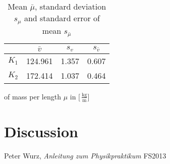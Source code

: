\documentclass[abstract=on]{scrreprt}
\newcommand{\unit}[1]{\ensuremath{\, \mathrm{#1}}}
\begin{document}
\begin{table}[H]
\center
\begin{tabular}{|c|ccc|}
\cline{2-4}
\multicolumn{1}{c|}{}& $\bar{v}$ & $s_{v}$ & $s_{\bar{v}}$\\ \hline
$K_1$ & 124.961 & 1.357 & 0.607 \\ \hline
$K_2$ & 172.414 & 1.037 & 0.464\\ \hline
\end{tabular}
\caption{Mean $\bar{\mu}$, standard deviation $s_{\mu}$ and standard error of mean $s_{\bar{\mu}}$} of mass per length $\mu$ in [$\unit{\frac{kg}{m}}$]
\end{table}

\section{Discussion}

\begin{thebibliography}{9}

  Peter Wurz,
  \emph{Anleitung zum Physikpraktikum}
  FS2013

\end{thebibliography}
\end{document}
